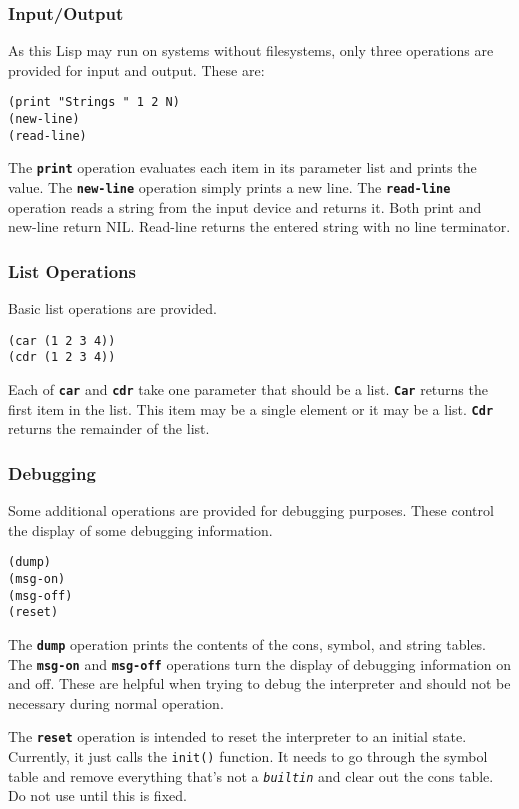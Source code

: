 \documentclass[10pt, openany]{book}
\newcommand{\operation}[1]{\textbf{\texttt{#1}}}
\newcommand{\function}[1]{\texttt{#1}}
\newcommand{\constant}[1]{\emph{\texttt{#1}}}
\begin{document}
\subsubsection{Input/Output}
As this Lisp may run on systems without filesystems, only three operations are provided for input and output.  These are:
\begin{lstlisting}
(print "Strings " 1 2 N)
(new-line)
(read-line)
\end{lstlisting}
The \operation{print} operation evaluates each item in its parameter list and prints the value.  The \operation{new-line} operation simply prints a new line.  The \operation{read-line} operation reads a string from the input device and returns it.  Both print and new-line return NIL.  Read-line returns the entered string with no line terminator.

\subsubsection{List Operations}
Basic list operations are provided.
\begin{lstlisting}
(car (1 2 3 4))
(cdr (1 2 3 4))
\end{lstlisting}
Each of \operation{car} and \operation{cdr} take one parameter that should be a list.  \operation{Car} returns the first item in the list.  This item may be a single element or it may be a list.  \operation{Cdr} returns the remainder of the list.

\subsubsection{Debugging}
Some additional operations are provided for debugging purposes.  These control the display of some debugging information.
\begin{lstlisting}
(dump)
(msg-on)
(msg-off)
(reset)
\end{lstlisting}

The \operation{dump} operation prints the contents of the cons, symbol, and string tables.  The \operation{msg-on} and \operation{msg-off} operations turn the display of debugging information on and off.  These are helpful when trying to debug the interpreter and should not be necessary during normal operation.

The \operation{reset} operation is intended to reset the interpreter to an initial state.  Currently, it just calls the \function{init()} function.  It needs to go through the symbol table and remove everything that's not a \constant{builtin} and clear out the cons table.  Do not use until this is fixed.
\end{document}
